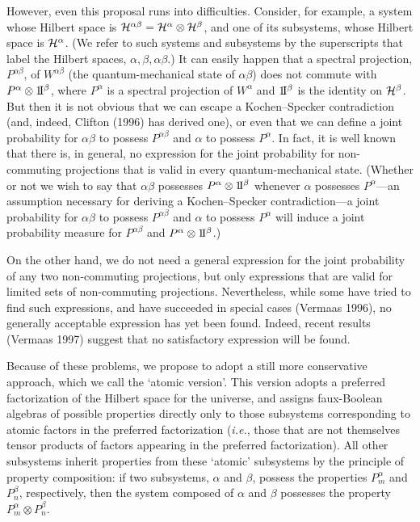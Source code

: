\documentclass[12pt]{article}
\newcommand{\ie}{{\it i.e.}}         %
\newcommand{\ident}{1\!{\rm I}}                                 %
\newcommand{\cH}{\cal{H}}                                       %
\newcommand{\ga}{\alpha}                                        %
\newcommand{\gb}{\beta}                                         %
\newcommand{\gab}{\alpha\beta}                                  %
\begin{document}
However, even this proposal runs into difficulties.  Consider, for
example, a system whose Hilbert space is $\cH^{\gab} = \cH^{\ga}
\otimes \cH^{\gb}$, and one of its subsystems, whose Hilbert space is
$\cH^{\ga}$.  (We refer to such systems and subsystems by the
superscripts that label the Hilbert spaces, $\ga, \gb, \gab$.) It can
easily happen that a spectral projection, $P^{\gab}$, of $W^{\gab}$
(the quantum-mechanical state of $\gab$) does not commute with
$P^{\ga} \otimes \ident^{\gb}$, where $P^{\ga}$ is a spectral projection of
$W^{\ga}$ and $\ident^{\gb}$ is the identity on $\cH^{\gb}$.  But then it is
not obvious that we can escape a Kochen--Specker contradiction (and, indeed,
Clifton (1996) has derived one), or even that we can define a joint
probability for $\gab$ to possess
$P^{\gab}$ and $\ga$ to possess $P^{\ga}$. In fact, it is well known that
there is, in general, no expression for the joint probability for
non-commuting projections that is valid in every quantum-mechanical
state.  (Whether or not we wish to say that $\gab$ possesses $P^{\ga}
\otimes \ident^{\gb}$ whenever $\ga$ possesses $P^{\ga}$---an assumption
necessary for deriving a Kochen--Specker contradiction---a joint
probability for $\gab$ to possess $P^{\gab}$ and $\ga$ to possess
$P^{\ga}$ will induce a joint probability measure for $P^{\gab}$ and
$P^{\ga} \otimes \ident^{\gb}$.)

On the other hand, we do not need a general expression for the joint 
probability of any two non-commuting projections, but only expressions 
that are valid for limited sets of non-commuting projections.  
Nevertheless, while some have tried to find such expressions, and have 
succeeded in special cases (Vermaas 1996), no generally acceptable 
expression has yet been found.  Indeed, recent results (Vermaas 1997) 
suggest that no satisfactory expression will be found.

Because of these problems, we propose to adopt a still more 
conservative approach, which we call the `atomic version'.  This 
version adopts a preferred factorization of the Hilbert space for the 
universe, and assigns faux-Boolean algebras of possible properties 
directly only to those subsystems corresponding to atomic factors in 
the preferred factorization (\ie, those that are not themselves tensor 
products of factors appearing in the preferred factorization).  All 
other subsystems inherit properties from these `atomic' subsystems by 
the principle of property composition: if two subsystems, $\ga$ and 
$\gb$, possess the properties $P^{\ga}_{m}$ and $P^{\gb}_{n}$, 
respectively, then the system composed of $\ga$ and $\gb$ possesses 
the property $P^{\ga}_{m} \otimes P^{\gb}_{n}$.
\end{document}
